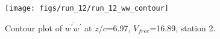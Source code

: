\begin{figure}[H]
\centering
\texttt{[image: figs/run\_12/run\_12\_ww\_contour]}
\caption{Contour plot of $\overline{w^\prime w^\prime}$ at $z/c$=6.97, $V_{free}$=16.89, station 2.}
\label{fig:run_12_ww_contour}
\end{figure}


